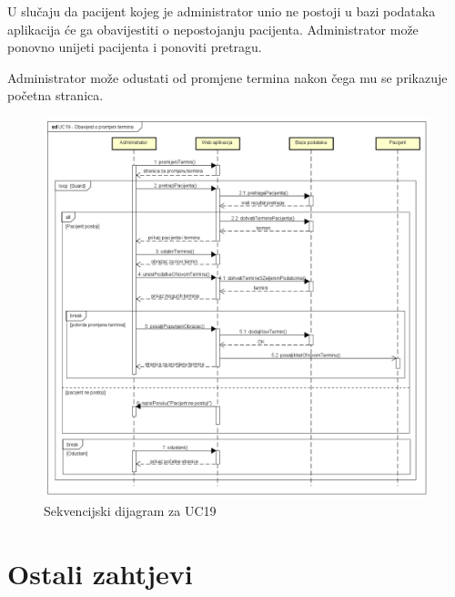 				U slučaju da pacijent kojeg je administrator unio ne postoji u bazi podataka aplikacija će ga obavijestiti o nepostojanju pacijenta. Administrator može ponovno unijeti pacijenta i ponoviti pretragu. 
				
				Administrator može odustati od promjene termina nakon čega mu se prikazuje početna stranica.
				
				\begin{figure}[H]
					\includegraphics[scale=0.4]{slike/UC19_Obavijest_o_promjeni_termina.PNG} %
					\centering
					\caption{Sekvencijski dijagram za UC19}
					\label{fig:sekvencijski_dijagram_4}
				\end{figure}
				\eject
	
		\section{Ostali zahtjevi}
			 
